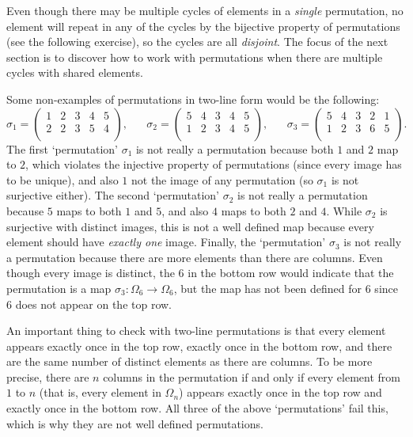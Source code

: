 Even though there may be multiple cycles of elements in a \textit{single} permutation, no element will repeat in any of the cycles by the bijective property of permutations (see the following exercise), so the cycles are all \textit{disjoint}. The focus of the next section is to discover how to work with permutations when there are multiple cycles with shared elements.

\begin{example}
    Some non-examples of permutations in two-line form would be the following:
    \[
    \sigma_{1} = \begin{pmatrix}
        1 & 2 & 3 & 4 & 5 \\
        2 & 2 & 3 & 5 & 4 \\
    \end{pmatrix}, \hspace{20pt} \sigma_{2} = \begin{pmatrix}
        5 & 4 & 3 & 4 & 5 \\
        1 & 2 & 3 & 4 & 5 \\
    \end{pmatrix}, \hspace{20pt} \sigma_{3} = \begin{pmatrix}
        5 & 4 & 3 & 2 & 1 \\
        1 & 2 & 3 & 6 & 5 \\
    \end{pmatrix}.
    \]
    The first `permutation' $\sigma_{1}$ is not really a permutation because both $1$ and $2$ map to $2$, which violates the injective property of permutations (since every image has to be unique), and also $1$ not the image of any permutation (so $\sigma_{1}$ is not surjective either). The second `permutation' $\sigma_{2}$ is not really a permutation because $5$ maps to both $1$ and $5$, and also $4$ maps to both $2$ and $4$. While $\sigma_{2}$ is surjective with distinct images, this is not a well defined map because every element should have \textit{exactly one} image. Finally, the `permutation' $\sigma_{3}$ is not really a permutation because there are more elements than there are columns. Even though every image is distinct, the $6$ in the bottom row would indicate that the permutation is a map $\sigma_{3} \colon \Omega_{6} \to \Omega_{6}$, but the map has not been defined for $6$ since $6$ does not appear on the top row.

    An important thing to check with two-line permutations is that every element appears exactly once in the top row, exactly once in the bottom row, and there are the same number of distinct elements as there are columns. To be more precise, there are $n$ columns in the permutation if and only if every element from $1$ to $n$ (that is, every element in $\Omega_{n}$) appears exactly once in the top row and exactly once in the bottom row. All three of the above `permutations' fail this, which is why they are not well defined permutations.


\end{example}
